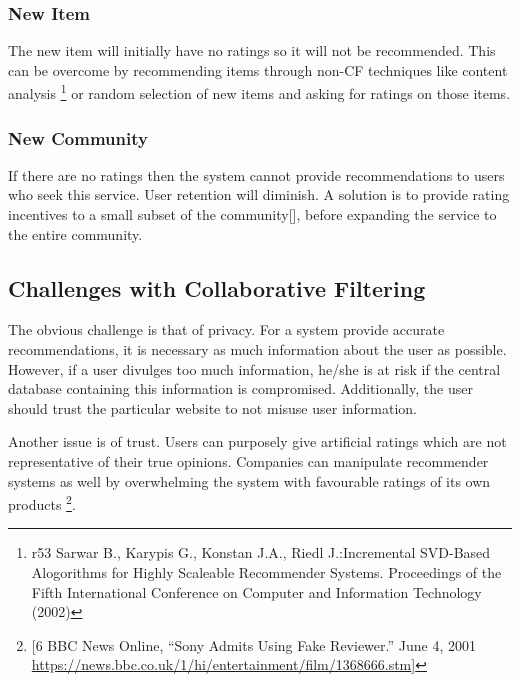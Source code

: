 \subsubsection{New Item }
The new item will initially have no ratings so it will not be recommended. This can be overcome by recommending items through non-CF techniques like content analysis \footnote{r53 Sarwar B., Karypis G., Konstan J.A., Riedl J.:Incremental SVD-Based Alogorithms for Highly Scaleable Recommender Systems. Proceedings of the Fifth International Conference on Computer and Information Technology (2002)} or random selection of new items and asking for ratings on those items.

\subsubsection{New Community}
If there are no ratings then the system cannot provide recommendations to users who seek this service. User retention will diminish. A solution is to provide rating incentives to a small subset of the community[], before expanding the service to the entire community. 

\subsection{Challenges with Collaborative Filtering}

The obvious challenge is that of privacy. For a system provide accurate recommendations, it is necessary as much information about the user as possible. However, if a user divulges too much information, he/she is at risk if the central database containing this information is compromised. Additionally, the user should trust the particular website to not misuse user information.

Another issue is of trust. Users can purposely give artificial ratings which are not representative of their true opinions. Companies can manipulate recommender systems as well by overwhelming the system with favourable ratings of its own products \footnote{[6 BBC News Online, ``Sony Admits Using Fake Reviewer.'' June 4, 2001 \url{https://news.bbc.co.uk/1/hi/entertainment/film/1368666.stm}]}.
